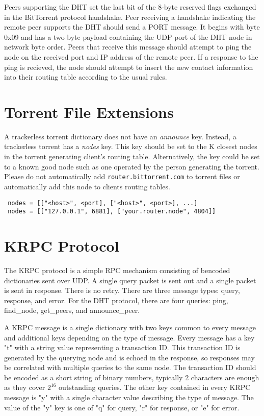 \documentclass{article}
\begin{document}
Peers supporting the DHT set the last bit of the 8-byte reserved flags exchanged in the BitTorrent protocol handshake. Peer receiving a handshake indicating the remote peer supports the DHT should send a PORT message. It begins with byte 0x09 and has a two byte payload containing the UDP port of the DHT node in network byte order. Peers that receive this message should attempt to ping the node on the received port and IP address of the remote peer. If a response to the ping is recieved, the node should attempt to insert the new contact information into their routing table according to the usual rules.

{\section {Torrent File Extensions}}

A trackerless torrent dictionary does not have an {\em announce} key. Instead, a trackerless torrent has a {\em nodes} key. This key should be set to the K closest nodes in the torrent generating client's routing table. Alternatively, the key could be set to a known good node such as one operated by the person generating the torrent. Please do not automatically add {\tt router.bittorrent.com} to torrent files or automatically add this node to clients routing tables.

\begin{verbatim}
 nodes = [["<host>", <port], ["<host>", <port>], ...]
 nodes = [["127.0.0.1", 6881], ["your.router.node", 4804]]
\end{verbatim}

{\section {KRPC Protocol}}

The KRPC protocol is a simple RPC mechanism consisting of bencoded dictionaries sent over UDP. A single query packet is sent out and a single packet is sent in response. There is no retry. There are three message types: query, response, and error. For the DHT protocol, there are four queries: ping, find\_node, get\_peers, and announce\_peer.

A KRPC message is a single dictionary with two keys common to every message and additional keys depending on the type of message. Every message has a key "t" with a string value representing a transaction ID. This transaction ID is generated by the querying node and is echoed in the response, so responses may be correlated with multiple queries to the same node. The transaction ID should be encoded as a short string of binary numbers, typically 2 characters are enough as they cover $2^{16}$ outstanding queries. The other key contained in every KRPC message is "y" with a single character value describing the type of message. The value of the "y" key is one of "q" for query, "r" for response, or "e" for error.
\end{document}
